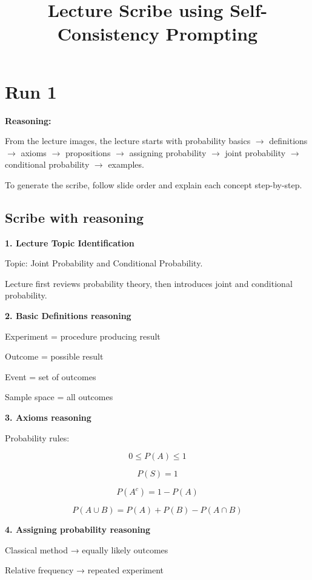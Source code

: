 \documentclass[12pt]{article}
\title{Lecture Scribe using Self-Consistency Prompting}
\author{}
\date{}
\begin{document}
\maketitle

\section*{Run 1}

\textbf{Reasoning:}

From the lecture images, the lecture starts with probability basics $\rightarrow$ definitions $\rightarrow$ axioms $\rightarrow$ propositions $\rightarrow$ assigning probability $\rightarrow$ joint probability $\rightarrow$ conditional probability $\rightarrow$ examples.

To generate the scribe, follow slide order and explain each concept step-by-step.

\subsection*{Scribe with reasoning}

\textbf{1. Lecture Topic Identification}

Topic: Joint Probability and Conditional Probability.

Lecture first reviews probability theory, then introduces joint and conditional probability.

\bigskip

\textbf{2. Basic Definitions reasoning}

Experiment = procedure producing result

Outcome = possible result

Event = set of outcomes

Sample space = all outcomes

\bigskip

\textbf{3. Axioms reasoning}

Probability rules:

\[
0 \le P(A) \le 1
\]

\[
P(S) = 1
\]

\[
P(A^c) = 1 - P(A)
\]

\[
P(A \cup B) = P(A) + P(B) - P(A \cap B)
\]

\bigskip

\textbf{4. Assigning probability reasoning}

Classical method → equally likely outcomes

Relative frequency → repeated experiment
\end{document}
